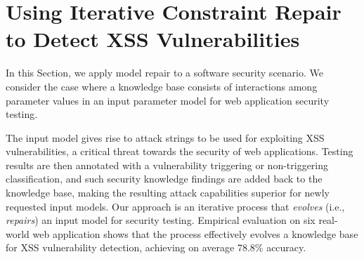 \begin{tikzborder}{\cite{Gargantini16:validation}}
\begin{tikzborder}{\cite{gargantini_combinatorial_2017}}
\section{Using Iterative Constraint Repair to Detect XSS Vulnerabilities}\label{sec:garn2019}

In this Section, we apply model repair to a software security scenario. 
We consider the case where a knowledge base consists of interactions among parameter values in an input parameter model for web application security testing.

The input model gives rise to attack strings to be used for exploiting XSS vulnerabilities, a critical threat towards the security of web applications.
Testing results are then annotated with a vulnerability triggering or non-triggering classification, and such security knowledge findings are added back to the knowledge base, making the resulting attack capabilities superior for newly requested input models.
Our approach is an iterative process that \textit{evolves} (i.e., \textit{repairs}) an input model for security testing.
Empirical evaluation on six real-world web application shows that the process effectively evolves a knowledge base for XSS vulnerability detection, achieving on average 78.8\% accuracy.


\end{tikzborder}
\end{tikzborder}
